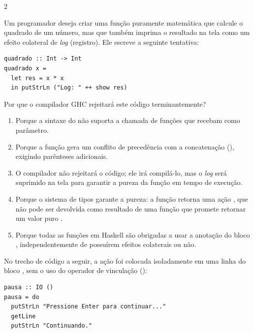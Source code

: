 \documentclass[a4paper,10pt,brazil]{article}
\begin{document}
\begin{multicols}{2}
\begin{enumerate}
\end{enumerate}

Um programador deseja criar uma função puramente matemática que calcule o quadrado de um número, mas que também imprima o resultado na tela como um efeito colateral de \emph{log} (registro). Ele escreve a seguinte tentativa:

\begin{verbatim}
quadrado :: Int -> Int
quadrado x = 
  let res = x * x
  in putStrLn ("Log: " ++ show res)
\end{verbatim}

Por que o compilador GHC rejeitará este código terminantemente?

\begin{enumerate}
  \item Porque a sintaxe do  não suporta a chamada de funções que recebam  como parâmetro.

  \item Porque a função  gera um conflito de precedência com a concatenação (\haskellinline{++}), exigindo parênteses adicionais.

  \item O compilador não rejeitará o código; ele irá compilá-lo, mas o \emph{log} será suprimido na tela para garantir a pureza da função em tempo de execução.

  \item Porque o sistema de tipos garante a pureza: a função  retorna uma ação , que não pode ser devolvida como resultado de uma função que promete retornar um valor puro .

  \item Porque todas as funções em Haskell são obrigadas a usar a anotação do bloco , independentemente de possuírem efeitos colaterais ou não.


\end{enumerate}

No trecho de código a seguir, a ação  foi colocada isoladamente em uma linha do bloco , sem o uso do operador de vinculação (\haskellinline{<-}):

\begin{verbatim}
pausa :: IO ()
pausa = do
  putStrLn "Pressione Enter para continuar..."
  getLine
  putStrLn "Continuando."
\end{verbatim}


\end{multicols}
\end{document}
